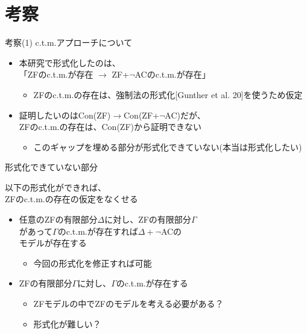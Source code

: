 \documentclass[17pt]{beamer}
\begin{document}
\section {考察}

\begin{frame}{考察(1) {\normalsize c.t.m.アプローチについて}}
    \vspace{-30pt}
    \,{\small 
    \begin{itemize}
        \item 本研究で形式化したのは、\\
              「ZFのc.t.m.が存在 $\rightarrow$ ZF+$\neg$ACのc.t.m.が存在」
              \vspace{5pt}
              \begin{itemize}
                \item ZFのc.t.m.の存在は、強制法の形式化[Gunther et al. 20]を使うため仮定
              \end{itemize}
        \item 証明したいのはCon(ZF)$\rightarrow$Con(ZF+$\neg$AC)だが、\\
              ZFのc.t.m.の存在は、Con(ZF)から証明できない
              \vspace{5pt}
              \begin{itemize} 
                \item このギャップを埋める部分が形式化できていない(本当は形式化したい)
              \end{itemize}
    \end{itemize}
    }
\end{frame}

\begin{frame}{形式化できていない部分}
    \vspace{-2pt}
    {\small 
        以下の形式化ができれば、\\ZFのc.t.m.の存在の仮定をなくせる
        \vspace{-4pt}
        \begin{itemize}
            \item 任意のZFの有限部分$\Delta$に対し、ZFの有限部分$\Gamma$\\
                  があって$\Gamma$のc.t.m.が存在すれば$\Delta + \neg$ACの\\
                  モデルが存在する
                  \begin{itemize}
                    \item 今回の形式化を修正すれば可能
                  \end{itemize}
        \vspace{-14pt}
        \item ZFの有限部分$\Gamma$に対し、$\Gamma$のc.t.m.が存在する
                  \begin{itemize}[itemsep=5pt]
                    \item ZFモデルの中でZFのモデルを考える必要がある？
                    \item 形式化が難しい？
                  \end{itemize}
                \end{itemize}
    }
\end{frame}
\end{document}
